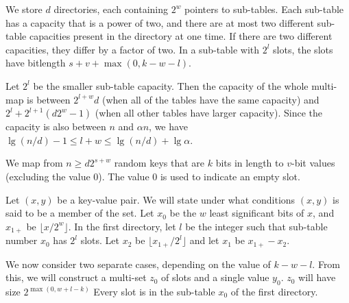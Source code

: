 \documentclass[11pt,letterpaper]{article}
\begin{document}
We store $d$ directories, each containing $2^w$ pointers to sub-tables.
Each sub-table has a capacity that is a power of two, and there are at most two different sub-table capacities present in the directory at one time.
If there are two different capacities, they differ by a factor of two.
In a sub-table with $2^l$ slots, the slots have bitlength $s + v + \max(0,k - w - l)$.

Let $2^l$ be the smaller sub-table capacity.
Then the capacity of the whole multi-map is between $2^{l+w}d$ (when all of the tables have the same capacity) and $2^l + 2^{l+1}(d 2^w - 1)$ (when all other tables have larger capacity).
Since the capacity is also between $n$ and $\alpha n$, we have $\lg (n/d) - 1 \leq l + w \leq \lg(n/d) + \lg \alpha$.


We map from $n \geq d 2^{s+w}$ random keys that are $k$ bits in length to $v$-bit values (excluding the value $0$).
The value $0$ is used to indicate an empty slot.


Let $(x,y)$ be a key-value pair.
We will state under what conditions $(x,y)$ is said to be a member of the set.
Let $x_0$ be the $w$ least significant bits of $x$, and $x_{1+}$ be $\lfloor x / 2^w \rfloor$.
In the first directory, let $l$ be the integer such that sub-table number $x_0$ has $2^l$ slots.
Let $x_2$ be $\lfloor x_{1+} / 2^l \rfloor$ and let $x_1$ be $x_{1+} - x_2$.

We now consider two separate cases, depending on the value of $k - w - l$.
From this, we will construct a multi-set $z_0$ of slots and a single value $y_0$.
$z_0$ will have size $2^{\max(0, w + l - k)}$
Every slot is in the sub-table $x_0$ of the first directory.
\end{document}
